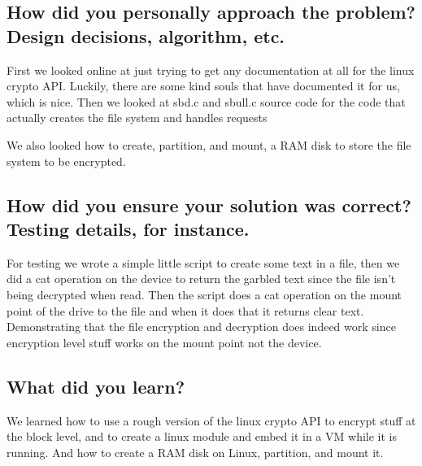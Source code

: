 \documentclass{article}
\begin{document}
\subsection{How did you personally approach the problem? Design decisions, algorithm, etc.}
    First we looked online at just trying to get any documentation at all for the linux crypto API. Luckily, there are some kind souls that have documented it for us, which is nice. Then we looked at sbd.c and sbull.c source code for the code that actually creates the file system and handles requests

We also looked how to create, partition, and mount, a RAM disk to store the file system to be encrypted.
\subsection{How did you ensure your solution was correct? Testing details, for instance.}
    For testing we wrote a simple little script to create some text in a file, then we did a cat operation on the device to return the garbled text since the file isn't being decrypted when read. Then the script does a cat operation on the mount point of the drive to the file and when it does that it returns clear text. Demonstrating that the file encryption and decryption does indeed work since encryption level stuff works on the mount point not the device.
\subsection{What did you learn?}
        We learned how to use a rough version of the linux crypto API to encrypt stuff at the block level, and to create a linux module and embed it in a VM while it is running. And how to create a RAM disk on Linux, partition, and mount it.
\end{document}
